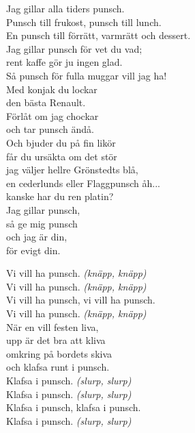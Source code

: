 \documentclass[a6paper, 10pt, twoside]{article}
\begin{document}
\noindent
\begin{center}
\end{center}
\begin{lyrics}
Jag gillar alla tiders punsch.\\
Punsch till frukost, punsch till lunch.\\
En punsch till förrätt, varmrätt och dessert.\\
Jag gillar punsch för vet du vad;\\
rent kaffe gör ju ingen glad.\\
Så punsch för fulla muggar vill jag ha!
\vspace{5pt}\\
Med konjak du lockar\\
den bästa Renault.\\
Förlåt om jag chockar\\
och tar punsch ändå.\\
Och bjuder du på fin likör\\
får du ursäkta om det stör\\
jag väljer hellre Grönstedts blå,\\
en cederlunds eller Flaggpunsch åh...\\
kanske har du ren platin?\\\digitalonly{\\}
Jag gillar punsch,\\
så ge mig punsch\\
och jag är din,\\
för evigt din.\\
\end{lyrics}

\noindent

\begin{center}
\end{center}
\begin{lyrics}
Vi vill ha punsch. \textit{(knäpp, knäpp)}\\
Vi vill ha punsch. \textit{(knäpp, knäpp)}\\
Vi vill ha punsch, vi vill ha punsch.\\
Vi vill ha punsch. \textit{(knäpp, knäpp)}
\vspace{5pt}\\
När en vill festen liva,\\
upp är det bra att kliva\\
omkring på bordets skiva\\
och klafsa runt i punsch.
\vspace{5pt}\\
Klafsa i punsch. \textit{(slurp, slurp)}\\
Klafsa i punsch. \textit{(slurp, slurp)}\\
Klafsa i punsch, klafsa i punsch.\\
Klafsa i punsch. \textit{(slurp, slurp)}
\end{lyrics}
\end{document}
